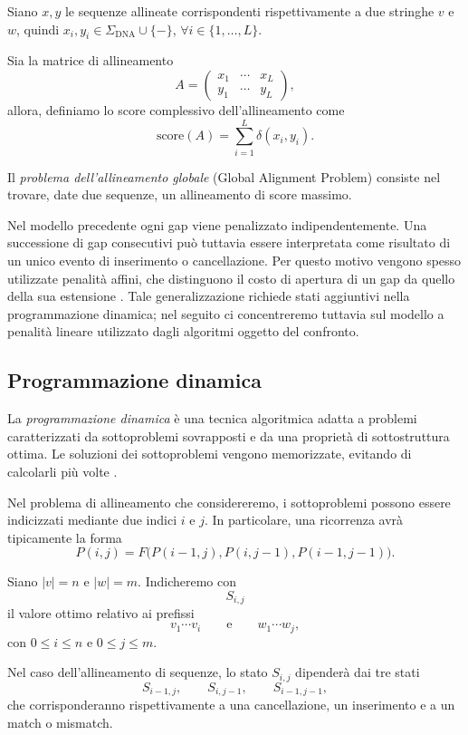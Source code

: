 Siano $x,y$ le sequenze allineate corrispondenti rispettivamente a due stringhe $v$ e $w$,
quindi $x_{i},y_{i}\in \Sigma_{\text{DNA}} \cup \{ - \}$, $\forall i \in \{ 1,\ldots,L \}$.

Sia la matrice di allineamento
\[
    A = \begin{pmatrix}
        x_{1} & \cdots & x_{L} \\
        y_{1} & \cdots & y_{L}
    \end{pmatrix},
\]
allora, definiamo lo score complessivo dell'allineamento come
\[
    \text{score}(A) = \sum^L_{i=1} \delta(x_i,y_i).
\]

Il \emph{problema dell'allineamento globale} (Global Alignment Problem) consiste nel trovare, date due sequenze, un allineamento di score massimo.

Nel modello precedente ogni gap viene penalizzato indipendentemente.
Una successione di gap consecutivi può tuttavia essere interpretata come risultato di un unico evento di inserimento o cancellazione.
Per questo motivo vengono spesso utilizzate penalità affini, che distinguono il costo di apertura di un gap da quello della sua estensione
\cite[p.~184]{jones--pevzner}.
Tale generalizzazione richiede stati aggiuntivi nella programmazione dinamica; nel seguito ci concentreremo tuttavia sul modello a penalità
lineare utilizzato dagli algoritmi oggetto del confronto.

\subsection{Programmazione dinamica}

La \emph{programmazione dinamica} è una tecnica algoritmica adatta a problemi caratterizzati da sottoproblemi sovrapposti
e da una proprietà di sottostruttura ottima.
Le soluzioni dei sottoproblemi vengono memorizzate, evitando di calcolarli più volte
\cite[Sec.~14.3]{cormen}.

Nel problema di allineamento che considereremo, i sottoproblemi possono essere indicizzati mediante due indici $i$ e $j$.
In particolare, una ricorrenza avrà tipicamente la forma
\[
    P(i,j) =
    F\bigl(P(i-1,j),P(i,j-1),P(i-1,j-1)\bigr).
\]

Siano $|v| = n$ e $|w| = m$. Indicheremo con
\[
    S_{i,j}
\]
il valore ottimo relativo ai prefissi
\[
     v_{1}\cdots v_{i} \qquad \text{e}\qquad w_{1} \cdots w_{j},
\]
con $0 \leq i \leq n$ e $0 \leq j \leq m$.

Nel caso dell'allineamento di sequenze, lo stato $S_{i,j}$ dipenderà dai tre stati
\[
    S_{i-1,j},\qquad S_{i,j-1},\qquad S_{i-1,j-1},
\]
che corrisponderanno rispettivamente a una cancellazione, un inserimento e a un match o mismatch.

